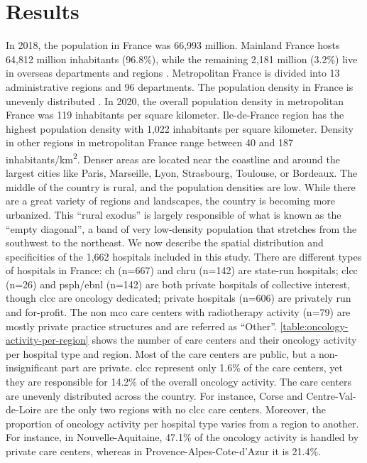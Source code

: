 \section{Results}

In 2018, the population in France was 66,993 million. Mainland France hosts 64,812 million inhabitants (96.8\%), while the remaining 2,181 million (3.2\%) live in overseas departments and regions . Metropolitan France is divided into 13 administrative regions and 96 departments. The population density in France is unevenly distributed . In 2020, the overall population density in metropolitan France was 119 inhabitants per square kilometer. Ile-de-France region has the highest population density with 1,022 inhabitants per square kilometer. Density in other regions in metropolitan France range between 40 and 187 inhabitants/km\textsuperscript{2}. Denser areas are located near the coastline and around the largest cities like Paris, Marseille, Lyon, Strasbourg, Toulouse, or Bordeaux. The middle of the country is rural, and the population densities are low. While there are a great variety of regions and landscapes, the country is becoming more urbanized. This ``rural exodus'' is largely responsible of what is known as the ``empty diagonal'', a band of very low-density population that stretches from the southwest to the northeast.
We now describe the spatial distribution and specificities of the 1,662 hospitals included in this study. There are different types of hospitals in France: \ac{ch}  (n=667) and \ac{chru}  (n=142) are state-run hospitals; \ac{clcc}  (n=26) and \ac{psph}/\ac{ebnl}  (n=142) are both private hospitals of collective interest, though \ac{clcc} are oncology dedicated; private hospitals (n=606) are privately run and for-profit. The non \ac{mco} care centers with radiotherapy activity (n=79) are mostly private practice structures and are referred as “Other”. \cref{table:oncology-activity-per-region} shows the number of care centers and their oncology activity per hospital type and region. Most of the care centers are public, but a non-insignificant part are private. \ac{clcc} represent only 1.6\% of the care centers, yet they are responsible for 14.2\% of the overall oncology activity. The care centers are unevenly distributed across the country. For instance, Corse and Centre-Val-de-Loire are the only two regions with no \ac{clcc} care centers. Moreover, the proportion of oncology activity per hospital type varies from a region to another. For instance, in Nouvelle-Aquitaine, 47.1\% of the oncology activity is handled by private care centers, whereas in Provence-Alpes-Cote-d'Azur it is 21.4\%.

